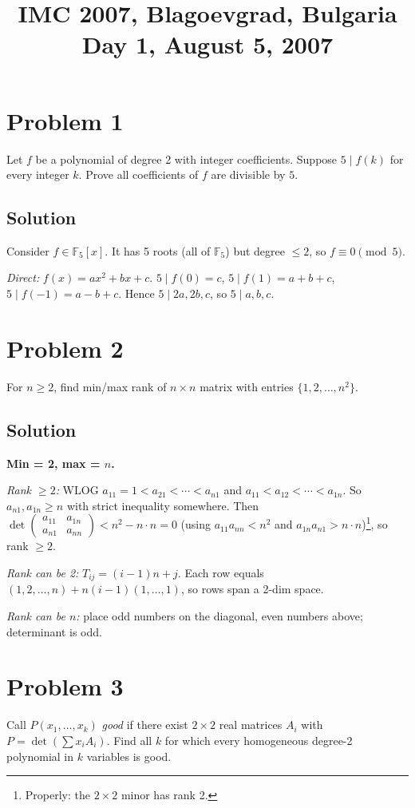 \documentclass{article}
\title{IMC 2007, Blagoevgrad, Bulgaria \\ Day 1, August 5, 2007}
\date{}
\begin{document}
\maketitle

\section*{Problem 1}
Let $f$ be a polynomial of degree 2 with integer coefficients. Suppose $5 \mid f(k)$ for every integer $k$. Prove all coefficients of $f$ are divisible by $5$.

\subsection*{Solution}
Consider $f \in \mathbb{F}_5[x]$. It has 5 roots (all of $\mathbb{F}_5$) but degree $\le 2$, so $f \equiv 0 \pmod 5$.

\emph{Direct:} $f(x) = ax^2 + bx + c$. $5 \mid f(0) = c$, $5 \mid f(1) = a + b + c$, $5 \mid f(-1) = a - b + c$. Hence $5 \mid 2a, 2b, c$, so $5 \mid a, b, c$.

\section*{Problem 2}
For $n \ge 2$, find min/max rank of $n \times n$ matrix with entries $\{1, 2, \ldots, n^2\}$.

\subsection*{Solution}
\textbf{Min = 2, max = $n$.}

\emph{Rank $\ge 2$:} WLOG $a_{11} = 1 < a_{21} < \cdots < a_{n1}$ and $a_{11} < a_{12} < \cdots < a_{1n}$. So $a_{n1}, a_{1n} \ge n$ with strict inequality somewhere. Then $\det\begin{pmatrix}a_{11} & a_{1n} \\ a_{n1} & a_{nn}\end{pmatrix} < n^2 - n \cdot n = 0$ (using $a_{11} a_{nn} < n^2$ and $a_{1n} a_{n1} > n \cdot n$)\footnote{Properly: the $2 \times 2$ minor has rank 2.}, so rank $\ge 2$.

\emph{Rank can be 2:} $T_{ij} = (i-1) n + j$. Each row equals $(1, 2, \ldots, n) + n(i-1)(1, \ldots, 1)$, so rows span a 2-dim space.

\emph{Rank can be $n$:} place odd numbers on the diagonal, even numbers above; determinant is odd.

\section*{Problem 3}
Call $P(x_1, \ldots, x_k)$ \emph{good} if there exist $2 \times 2$ real matrices $A_i$ with $P = \det(\sum x_i A_i)$. Find all $k$ for which every homogeneous degree-2 polynomial in $k$ variables is good.
\end{document}
